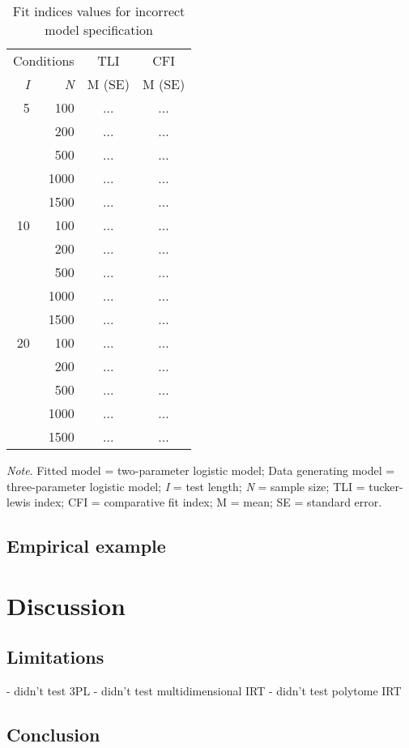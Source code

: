 \documentclass[Royal,sageapa,times,doublespace]{sagej}
\begin{document}
\begin{table}[b!]
\caption{Fit indices values for incorrect model specification}
\begin{tabular}{ r r | c c }
\toprule
\multicolumn{2}{c}{Conditions} & \multicolumn{1}{c}{TLI} & \multicolumn{1}{c}{CFI} \\
\textit{I} & \textit{N} & M (SE) & M (SE) \\
\midrule
 5 & 100 & ... & ... \\
& 200 & ... & ... \\
& 500 & ... & ... \\
& 1000 & ... & ... \\
& 1500 & ... & ... \\
10 & 100 & ... & ... \\
& 200 & ... & ... \\
& 500 & ... & ... \\
& 1000 & ... & ... \\
& 1500 & ... & ... \\
20 & 100 & ... & ... \\
& 200 & ... & ... \\
& 500 & ... & ... \\
& 1000 & ... & ... \\
& 1500 & ... & ... \\
\bottomrule
\end{tabular}

\bigskip
\small\textit{Note}. Fitted model = two-parameter logistic model; Data generating model = three-parameter logistic model; \textit{I} = test length; \textit{N} = sample size; TLI = tucker-lewis index; CFI = comparative fit index; M = mean; SE = standard error.
\label{tab:5}
\end{table}

\newpage

\subsection{Empirical example}

\section{Discussion}

\subsection{Limitations}

 - didn't test 3PL
- didn't test multidimensional IRT
- didn't test polytome IRT


\subsection{Conclusion}

%
%
\end{document}
